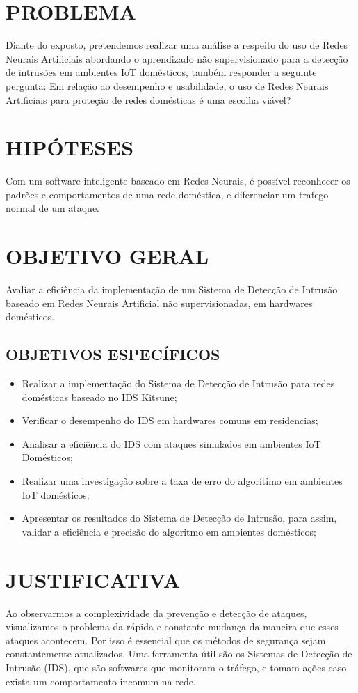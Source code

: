 \chapter{PROBLEMA}
Diante do exposto, pretendemos realizar uma análise a respeito do uso de Redes Neurais Artificiais abordando o aprendizado não supervisionado para a detecção de intrusões em ambientes IoT domésticos, também responder a seguinte pergunta: Em relação ao desempenho e usabilidade, o uso de Redes Neurais Artificiais para proteção de redes domésticas é uma escolha viável?

\chapter{HIPÓTESES}
Com um software inteligente baseado em Redes Neurais, é possível reconhecer os padrões e comportamentos de uma rede doméstica, e diferenciar um trafego normal de um ataque.

\chapter{OBJETIVO GERAL}
Avaliar a eficiência da implementação de um Sistema de Detecção de Intrusão baseado em Redes Neurais Artificial não supervisionadas, em hardwares domésticos.

\section{OBJETIVOS ESPECÍFICOS}
\begin{itemize}
    \item Realizar a implementação do Sistema de Detecção de Intrusão para redes domésticas baseado no IDS Kitsune;
    \item Verificar o desempenho do IDS em hardwares comuns em residencias;
    \item Analisar a eficiência do IDS com ataques simulados em ambientes IoT Domésticos;
    \item Realizar uma investigação sobre a taxa de erro do algorítimo em ambientes IoT domésticos;
    \item Apresentar os resultados do Sistema de Detecção de Intrusão, para assim, validar a eficiência e precisão do algoritmo em ambientes domésticos; 
 \end{itemize}

\chapter{JUSTIFICATIVA}
Ao observarmos a complexividade da prevenção e detecção de ataques, visualizamos o problema da rápida e constante mudança da maneira que esses ataques acontecem. Por isso é essencial que os métodos de segurança sejam constantemente atualizados. Uma ferramenta útil são os Sistemas de Detecção de Intrusão (IDS), que são softwares que monitoram o tráfego, e tomam ações caso exista um comportamento incomum na rede.

